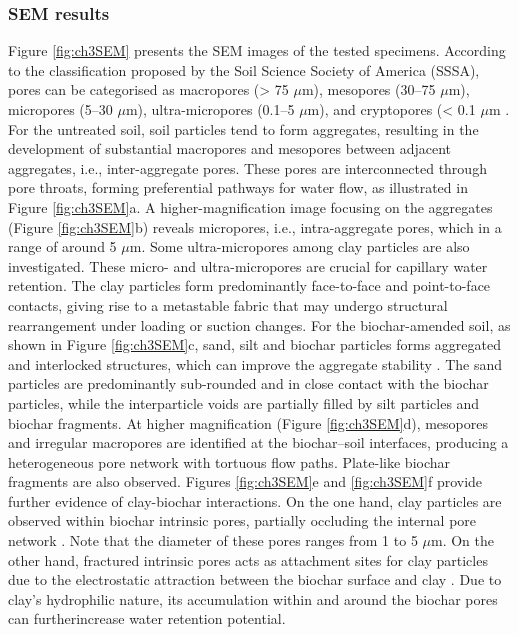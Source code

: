\subsubsection{\Ac{SEM} results}
Figure \ref{fig:ch3SEM} presents the SEM images of the tested specimens. According to the classification proposed by the Soil Science Society of America (SSSA), pores can be categorised as macropores (> 75 $\mu$m), mesopores (30–75 $\mu$m), micropores (5–30 $\mu$m), ultra-micropores (0.1–5 $\mu$m), and cryptopores (< 0.1 $\mu$m \parencite{dongMicrostructuralInvestigationUnsaturated2024}. For the untreated soil, soil particles tend to form aggregates, resulting in the development of substantial macropores and mesopores between adjacent aggregates, i.e., inter-aggregate pores. These pores are interconnected through pore throats, forming preferential pathways for water flow, as illustrated in Figure \ref{fig:ch3SEM}a. A higher-magnification image focusing on the aggregates (Figure \ref{fig:ch3SEM}b) reveals micropores, i.e., intra-aggregate pores, which in a range of around 5 $\mu$m. Some ultra-micropores among clay particles are also investigated. These micro- and ultra-micropores are crucial for capillary water retention. The clay particles form predominantly face-to-face and point-to-face contacts, giving rise to a metastable fabric that may undergo structural rearrangement under loading or suction changes.
For the biochar-amended soil, as shown in Figure \ref{fig:ch3SEM}c, sand, silt and biochar particles forms aggregated and interlocked structures, which can improve the aggregate stability \parencite{baiamonteEffectBiocharPhysical2019}. The sand particles are predominantly sub-rounded and in close contact with the biochar particles, while the interparticle voids are partially filled by silt particles and biochar fragments. At higher magnification (Figure \ref{fig:ch3SEM}d), mesopores and irregular macropores are identified at the biochar–soil interfaces, producing a heterogeneous pore network with tortuous flow paths. Plate-like biochar fragments are also observed. Figures \ref{fig:ch3SEM}e and \ref{fig:ch3SEM}f provide further evidence of clay-biochar interactions. On the one hand, clay particles are observed within biochar intrinsic pores, partially occluding the internal pore network \parencite{jingInteractionsBiocharClay2022}. Note that the diameter of these pores ranges from 1 to 5 $\mu$m. On the other hand, fractured intrinsic pores acts as attachment sites for clay particles due to the electrostatic attraction between the biochar surface and clay \parencite{yaoCharacterizationEnvironmentalApplications2014}. Due to clay's hydrophilic nature, its accumulation within and around the biochar pores can furtherincrease water retention potential. \par
